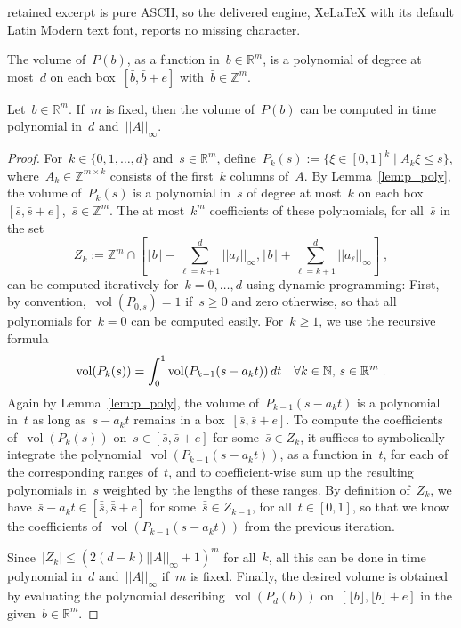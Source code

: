 \documentclass[10pt,a4paper]{amsart}
\newcommand{\N}{\mathbb{N}}
\newcommand{\R}{\mathbb{R}}
\newcommand{\Z}{\mathbb{Z}}
\renewcommand{\d}{\,\textnormal{d}}
\DeclareMathOperator{\vol}{vol}
\begin{document}
retained excerpt is pure ASCII, so the delivered engine, XeLaTeX with its default Latin Modern text font, reports no missing character.
\begin{lemma}\label{lem:p_poly}
  The volume of~$P(b)$, as a function in~$b\in\R^m$, is a polynomial
  of degree at most~$d$ on each box~$[\bar b,\bar b+e]$ with~$\bar
  b\in\Z^m$.
\end{lemma}

\begin{lemma}\label{lem:pseudo_vol}
  Let~$b\in\R^m$. If~$m$ is fixed, then the volume of~$P(b)$ can be
  computed in time polynomial in~$d$ and~$||A||_\infty$.
\end{lemma}

\begin{proof}
  For~$k\in\{0,1,\dots,d\}$ and~$s\in\R^m$,
  define~$P_{k}(s):=\{\xi\in[0,1]^k\mid A_k\xi\le s\}$,
  where~$A_k\in\Z^{m\times k}$ consists of the first~$k$ columns
  of~$A$. By Lemma~\ref{lem:p_poly}, the volume of~$P_{k}(s)$ is a
  polynomial in~$s$ of degree at most~$k$ on each box~$[\bar s,\bar
    s+e]$,~$\bar s\in\Z^m$. The at most~$k^m$ coefficients of these
  polynomials, for all~$\bar s$ in the set
  \[
  \textstyle Z_k:=\Z^m\cap [\lfloor
    b\rfloor-\sum_{\ell=k+1}^d||a_\ell||_\infty,\lfloor
    b\rfloor+\sum_{\ell=k+1}^d||a_\ell||_\infty]\;,
  \]  
  can be computed iteratively for~$k=0,\dots,d$ using dynamic
  programming: First, by convention,~$\vol(P_{0,s})=1$ if~$s\ge 0$ and
  zero otherwise, so that all polynomials for~$k=0$ can be computed
  easily. For~$k\ge 1$, we use the recursive formula
  \[
    \vol(P_{k}(s))=\int_0^1\vol(P_{k-1}(s-a_kt))\d t\quad\forall
    k\in\N,\,s\in\R^m\;.
  \]
  Again by Lemma~\ref{lem:p_poly}, the volume of~$P_{k-1}(s-a_kt)$ is
  a polynomial in~$t$ as long as~$s-a_kt$ remains in a box~$[\bar
    s,\bar s+e]$. To compute the coefficients of~$\vol(P_{k}(s))$
  on~$s\in[\bar s,\bar s+e]$ for some~$\bar s\in Z_k$, it suffices to
  symbolically integrate the polynomial~$\vol(P_{k-1}(s-a_kt))$, as a
  function in~$t$, for each of the corresponding ranges of~$t$, and to
  coefficient-wise sum up the resulting polynomials in~$s$ weighted by
  the lengths of these ranges. By definition of~$Z_k$, we have~$\bar
  s-a_kt\in[\bar{\bar s},\bar{\bar s}+e]$ for some~$\bar{\bar s}\in
  Z_{k-1}$, for all~$t\in[0,1]$, so that we know the coefficients
  of~$\vol(P_{k-1}(s-a_kt))$ from the previous iteration.

  Since~$|Z_k|\le (2(d-k)||A||_\infty+1)^m$ for all~$k$, all this can
  be done in time polynomial in~$d$ and~$||A||_\infty$ if~$m$ is
  fixed. Finally, the desired volume is obtained by evaluating the
  polynomial describing~$\vol(P_{d}(b))$ on~$[\lfloor b\rfloor,\lfloor
    b\rfloor+e]$ in the given~$b\in\R^m$.
\end{proof}
\end{document}
